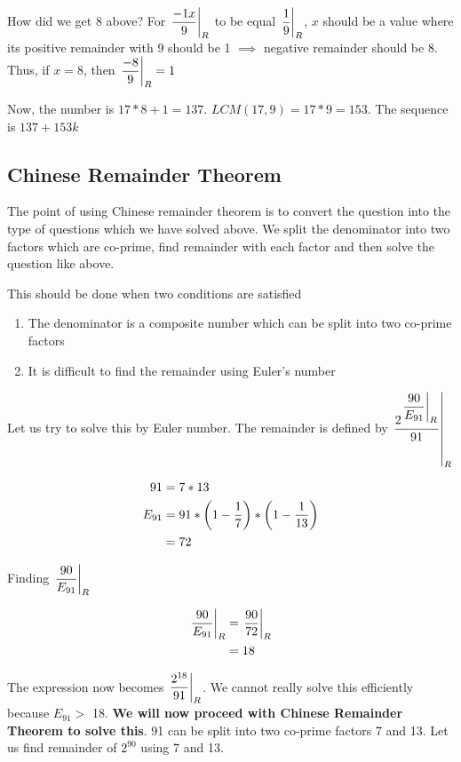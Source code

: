 \begin{NOTE}
    How did we get 8 above? For $\displaystyle{ \left. \frac{-1x}{9} \right |_{R} }$ to be equal $\displaystyle{ \left. \frac{1}{9} \right |_{R} }$, $x$ should be a value where its positive remainder with 9 should be 1 $\implies$ negative remainder should be 8. Thus, if $x=8$, then $\displaystyle{ \left. \frac{-8}{9} \right |_{R} } = 1$
\end{NOTE}

Now, the number is $17 * 8 + 1 = 137$. $LCM(17,9) = 17 * 9 = 153$. The sequence is $137 + 153k$

\subsection{Chinese Remainder Theorem}

The point of using Chinese remainder theorem is to convert the question into the type of questions which we have solved above. We split the denominator into two factors which are co-prime, find remainder with each factor and then solve the question like above. 

This should be done when two conditions are satisfied

\begin{enumerate}
    \item The denominator is a composite number which can be split into two co-prime factors
    
    \item It is difficult to find the remainder using Euler's number
\end{enumerate}


Let us try to solve this by Euler number. The remainder is defined by $\displaystyle{ \left. \frac{2^{ \displaystyle{ \left. \frac{90}{E_{91}} \right |_{R} } }}{91} \right |_{R} }$

\begin{align*}
    91 &= 7 * 13 \\
    E_{91} &= 91 * \left ( 1 - \dfrac{1}{7} \right ) * \left ( 1 - \dfrac{1}{13} \right ) \\
    &= 72
\end{align*}

Finding $\displaystyle{ \left. \frac{90}{E_{91}} \right |_{R} }$

\begin{align*}
    \displaystyle{ \left. \frac{90}{E_{91}} \right |_{R} } &= \displaystyle{ \left. \frac{90}{72} \right |_{R} } \\
    &= 18
\end{align*}

The expression now becomes $\displaystyle{ \left. \frac{2^{18}}{91} \right |_{R} }$. We cannot really solve this efficiently because $E_{91} > $ 18. \textbf{We will now proceed with Chinese Remainder Theorem to solve this}. 91 can be split into two co-prime factors 7 and 13. Let us find remainder of $2^{90}$ using 7 and 13. 

